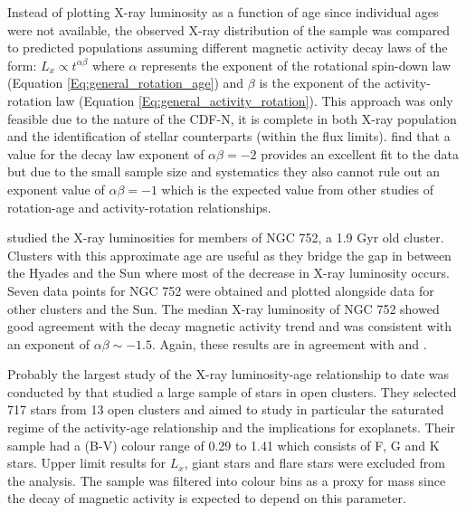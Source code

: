 Instead of plotting X-ray luminosity as a function of age since individual ages were not available, the observed X-ray distribution of the sample was compared to predicted populations assuming different magnetic activity decay laws of the form: $L_{x} \propto t^{\alpha\beta}$ where $\alpha$ represents the exponent of the rotational spin-down law (Equation \ref{Eq:general_rotation_age}) and $\beta$ is the exponent of the activity-rotation law (Equation \ref{Eq:general_activity_rotation}). This approach was only feasible due to the nature of the CDF-N, it is complete in both X-ray population and the identification of stellar counterparts (within the flux limits). \citet{Feigelson_etal_2004} find that a value for the decay law exponent of $\alpha\beta = -2$ provides an excellent fit to the data but due to the small sample size and systematics they also cannot rule out an exponent value of $\alpha\beta = -1$ which is the expected value from other studies of rotation-age and activity-rotation relationships.

\citet{Giardino_etal_2008} studied the X-ray luminosities for members of NGC 752, a 1.9 Gyr old cluster. Clusters with this approximate age are useful as they bridge the gap in between the Hyades and the Sun where most of the decrease in X-ray luminosity occurs. Seven data points for NGC 752 were obtained and plotted alongside data for other clusters and the Sun. The median X-ray luminosity of NGC 752 showed good agreement with the decay magnetic activity trend and was consistent with an exponent of $\alpha\beta \sim -1.5$. Again, these results are in agreement with \citet{Maggio_etal_1987} and \citet{Feigelson_etal_2004}.

Probably the largest study of the X-ray luminosity-age relationship to date was conducted by \citet{Jackson_etal_2012} that studied a large sample of stars in open clusters. They selected 717 stars from 13 open clusters and aimed to study in particular the saturated regime of the activity-age relationship and the implications for exoplanets. Their sample had a (B-V) colour range of 0.29 to 1.41 which consists of F, G and K stars. Upper limit results for $L_{x}$, giant stars and flare stars were excluded from the analysis. The sample was filtered into colour bins as a proxy for mass since the decay of magnetic activity is expected to depend on this parameter.


